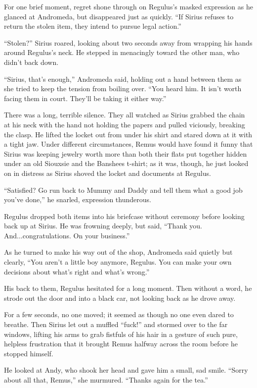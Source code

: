 For one brief moment, regret shone through on Regulus’s masked expression as he glanced at Andromeda, but disappeared just as quickly. “If Sirius refuses to return the stolen item, they intend to pursue legal action.”

“Stolen?” Sirius roared, looking about two seconds away from wrapping his hands around Regulus’s neck. He stepped in menacingly toward the other man, who didn’t back down.

“Sirius, that’s enough,” Andromeda said, holding out a hand between them as she tried to keep the tension from boiling over. “You heard him. It isn’t worth facing them in court. They’ll be taking it either way.”

There was a long, terrible silence. They all watched as Sirius grabbed the chain at his neck with the hand not holding the papers and pulled viciously, breaking the clasp. He lifted the locket out from under his shirt and stared down at it with a tight jaw. Under different circumstances, Remus would have found it funny that Sirius was keeping jewelry worth more than both their flats put together hidden under an old Siouxsie and the Banshees t-shirt; as it was, though, he just looked on in distress as Sirius shoved the locket and documents at Regulus.

“Satisfied? Go run back to Mummy and Daddy and tell them what a good job you’ve done,” he snarled, expression thunderous.

Regulus dropped both items into his briefcase without ceremony before looking back up at Sirius. He was frowning deeply, but said, “Thank you. And...congratulations. On your business.”

As he turned to make his way out of the shop, Andromeda said quietly but clearly, “You aren’t a little boy anymore, Regulus. You can make your own decisions about what’s right and what’s wrong.”

His back to them, Regulus hesitated for a long moment. Then without a word, he strode out the door and into a black car, not looking back as he drove away.

For a few seconds, no one moved; it seemed as though no one even dared to breathe. Then Sirius let out a muffled “fuck!” and stormed over to the far windows, lifting his arms to grab fistfuls of his hair in a gesture of such pure, helpless frustration that it brought Remus halfway across the room before he stopped himself.

He looked at Andy, who shook her head and gave him a small, sad smile. “Sorry about all that, Remus,” she murmured. “Thanks again for the tea.”


